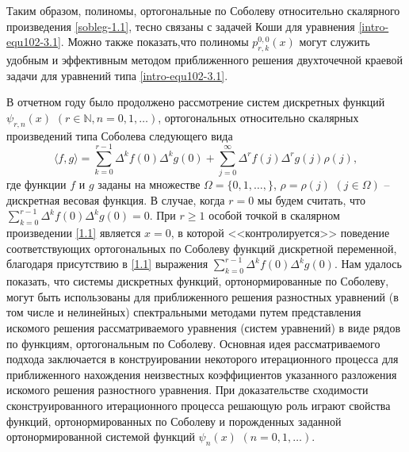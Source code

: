 Таким образом, полиномы, ортогональные по Соболеву относительно скалярного произведения \eqref{sobleg-1.1}, тесно связаны с задачей Коши для уравнения \eqref{intro-equ102-3.1}. Можно также показать,что полиномы $p_{r,k}^{0,0}(x)$ могут служить удобным и эффективным методом приближенного решения двухточечной краевой задачи для уравнений типа \eqref{intro-equ102-3.1}.








В отчетном году было продолжено рассмотрение систем дискретных функций $\mathcal{\psi}_{r,n}(x)$
$(r\in\mathbb{N}, n=0,1,\ldots)$, ортогональных относительно скалярных произведений типа Соболева следующего вида
\begin{equation}\label{1.1}
\langle f,g\rangle=\sum_{k=0}^{r-1}\Delta^kf(0)\Delta^kg(0)+
\sum_{j=0}^\infty\Delta^rf(j)\Delta^rg(j)\rho(j),
\end{equation}
где функции $f$ и $g$ заданы на  множестве $\Omega=\{0,1,\ldots,\}$, $\rho=\rho(j)$ $(j\in \Omega)$ -- дискретная весовая функция.   В случае, когда $r=0$ мы будем считать, что $\sum_{k=0}^{r-1}\Delta^kf(0)\Delta^kg(0)=0$. При $r\ge1$ особой точкой в скалярном произведении \eqref{1.1} является  $x=0$, в которой <<контролируется>> поведение соответствующих ортогональных по Соболеву функций дискретной переменной, благодаря присутствию в  \eqref{1.1} выражения  $\sum_{k=0}^{r-1}\Delta^kf(0)\Delta^kg(0)$. Нам удалось показать, что системы дискретных функций, ортонормированные по Соболеву, могут быть использованы для приближенного решения разностных уравнений (в том числе и нелинейных) спектральными методами путем представления искомого решения рассматриваемого уравнения (систем уравнений) в виде рядов по функциям, ортогональным по Соболеву. Основная идея рассматриваемого подхода заключается в конструировании некоторого итерационного процесса для приближенного нахождения неизвестных коэффициентов указанного разложения искомого решения разностного уравнения. При доказательстве сходимости сконструированного итерационного процесса решающую роль играют свойства функций, ортонормированных по Соболеву и порожденных заданной ортонормированной системой функций $\mathcal{\psi}_{n}(x)$ $( n=0,1,\ldots)$.

